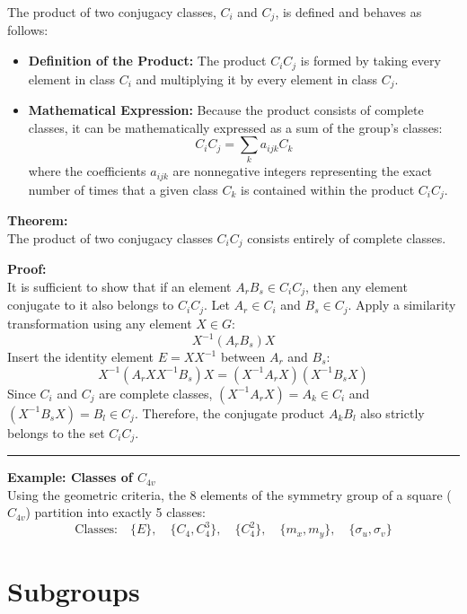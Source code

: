 \documentclass[11pt, a4paper]{report}
\begin{document}
The product of two conjugacy classes, $C_i$ and $C_j$, is defined and behaves as follows:
\begin{itemize}
    \item \textbf{Definition of the Product:} The product $C_i C_j$ is formed by taking every element in class $C_i$ and multiplying it by every element in class $C_j$.
    \item \textbf{Mathematical Expression:} Because the product consists of complete classes, it can be mathematically expressed as a sum of the group's classes:
    \[ C_i C_j = \sum_k a_{ijk} C_k \]
    where the coefficients $a_{ijk}$ are nonnegative integers representing the exact number of times that a given class $C_k$ is contained within the product $C_i C_j$.
\end{itemize}

\vspace{0.5em}
\textbf{Theorem:} \\
The product of two conjugacy classes $C_i C_j$ consists entirely of complete classes.

\vspace{0.5em}
\textbf{Proof:} \\
It is sufficient to show that if an element $A_r B_s \in C_i C_j$, then any element conjugate to it also belongs to $C_i C_j$. 
Let $A_r \in C_i$ and $B_s \in C_j$. Apply a similarity transformation using any element $X \in G$:
\[ X^{-1}(A_r B_s)X \]
Insert the identity element $E = X X^{-1}$ between $A_r$ and $B_s$:
\[ X^{-1}(A_r X X^{-1} B_s)X = (X^{-1}A_r X)(X^{-1}B_s X) \]
Since $C_i$ and $C_j$ are complete classes, $(X^{-1}A_r X) = A_k \in C_i$ and $(X^{-1}B_s X) = B_l \in C_j$. Therefore, the conjugate product $A_k B_l$ also strictly belongs to the set $C_i C_j$.

\vspace{1em}
\hrule
\vspace{1em}

\textbf{Example: Classes of $C_{4v}$} \\
Using the geometric criteria, the 8 elements of the symmetry group of a square ($C_{4v}$) partition into exactly 5 classes:
\[ \text{Classes:} \quad \{E\}, \quad \{C_4, C_4^3\}, \quad \{C_4^2\}, \quad \{m_x, m_y\}, \quad \{\sigma_u, \sigma_v\} \]

\section{Subgroups}
\end{document}
